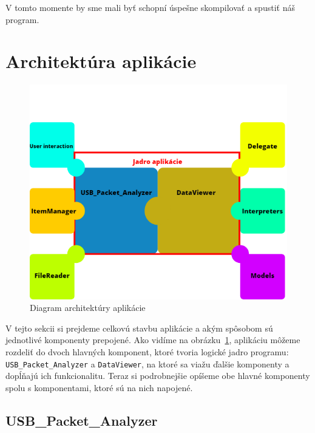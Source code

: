 V tomto momente by sme mali byť schopní úspešne skompilovať a spustiť náš program.

\newpage

\section{Architektúra aplikácie}

\begin{figure}[!htb]
	\centering
	\includegraphics[width=\textwidth]{img/kap04_architektura}
	\caption{Diagram architektúry aplikácie}
	\label{obr:kap4:architek}
\end{figure}

V tejto sekcii si prejdeme celkovú stavbu aplikácie a akým spôsobom sú jednotlivé komponenty prepojené. Ako vidíme na obrázku~\ref{obr:kap4:architek}, aplikáciu môžeme rozdeliť do dvoch hlavných komponent, ktoré tvoria logické jadro programu: \texttt{USB\_Packet\_Analyzer} a \texttt{DataViewer}, na ktoré sa viažu ďalšie komponenty a dopĺňajú ich funkcionalitu. Teraz si podrobnejšie opíšeme obe hlavné komponenty spolu s komponentami, ktoré sú na nich napojené.

\subsection{USB\_Packet\_Analyzer}

